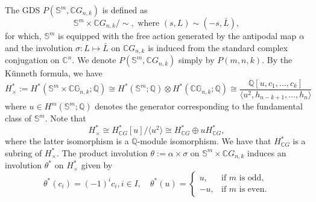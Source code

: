 \documentclass{amsart}
\begin{document}
	
	The GDS %
$P(\mathbb S^m,\mathbb CG_{n,k})$ is defined as
	\[
	\mathbb S^m\times \mathbb CG_{n,k}/\!\!\sim, \text { where } (s,L)\sim (-s,\bar L),
	\]
for which, $\mathbb S^m$ %
is equipped with the free action generated by the antipodal %
map $\alpha$ and %
the involution $\sigma: L \mapsto \bar L$ on $\mathbb CG_{n,k}$ is induced from the standard complex conjugation on $\mathbb C^n.$ We denote $P(\mathbb S^m,\mathbb CG_{n,k})$ simply by $P(m,n,k).$
	By the K\"unneth formula, we %
have
	\begin{equation}\label{Cohomology of H_times}
		H_{\times}^* := H^*(\mathbb{S}^m \times \mathbb{CG}_{n,k}; \mathbb{Q}) \cong H^*(\mathbb{S}^m; \mathbb{Q}) \otimes H^*(\mathbb{CG}_{n,k}; \mathbb{Q}) \cong \frac{\mathbb{Q}[u, c_1, \dots, c_k]}{\langle u^2, h_{n-k+1}, \dots, h_n \rangle}
	\end{equation}
	where %
$u \in H^m(\mathbb S^m; \mathbb Q)$ denotes the generator corresponding to the fundamental class of $\mathbb S^m$. Note that \begin{equation}\label{H in terms of u}
		H^*_{\times} \cong H^*_{\mathbb{C}G}[u]/\langle u^2 \rangle \cong H^*_{\mathbb{C}G} \oplus u H^*_{\mathbb{C}G},
	\end{equation} where the latter isomorphism is a $\mathbb Q$-module isomorphism. We have that $H^*_{\mathbb{C}G}$ is a subring of $H^*_\times$.
	The product involution $\theta:= \alpha\times\sigma$ on $\mathbb S^m\times \mathbb CG_{n,k}$ induces an involution $\theta^*$ on $H^*_\times$ given by
	\begin{equation}\label{defn of theta*}
		\theta^*(c_i) = (-1)^i c_i,i\in I, \quad \theta^*(u) =  
		\begin{cases}  
			u, & \text{if } m \text{ is odd}, \\  
			-u, & \text{if } m \text{ is even}.  
		\end{cases}  
	\end{equation}
\end{document}
